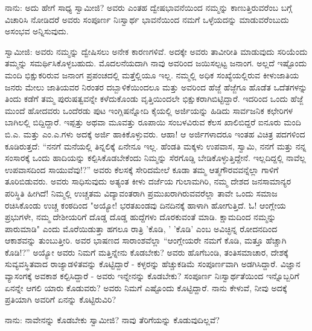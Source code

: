 ನಾನು: ಅದು ಹೇಗೆ ಸಾಧ್ಯ ಸ್ವಾಮೀಜಿ? ಅವರು ಎಂತಹ ದ್ವೇಷಭಾವನೆಯಿಂದ ನಮ್ಮನ್ನು ಕಾಣುತ್ತಿರುವರೆಂಬ ಬಗ್ಗೆ ವಿಚಾರಿಸಿ ನೋಡಿದರೆ ಅವರು ಸಂಪೂರ್ಣ ನಿಃಸ್ವಾರ್ಥ ಭಾವನೆಯಿಂದ ನಮಗೆ ಒಳ್ಳೆಯದನ್ನು ಮಾಡುವರೆಂಬುದು ಅಸಂಭವ ಅನ್ನಿಸುವುದು.

ಸ್ವಾಮೀಜಿ: ಅವರು ನಮ್ಮನ್ನು ದ್ವೇಷಿಸಲು ಅನೇಕ ಕಾರಣಗಳಿವೆ. ಅದಕ್ಕೇ ಅವರು ತಾವೀರೀತಿ ಮಾಡುವುದು ಸರಿಯೆಂದು ತಮ್ಮನ್ನು ಸಮರ್ಥಿಸಿಕೊಳ್ಳಬಹುದು. ಮೊದಲನೆಯದಾಗಿ ನಾವು ಅವರಿಂದ ಜಯಿಸಲ್ಪಟ್ಟ ಜನಾಂಗ. ಅಲ್ಲದೆ ಇಷ್ಟೊಂದು ಮಂದಿ ಭಿಕ್ಷುಕರಿರುವ ಜನಾಂಗ ಪ್ರಪಂಚದಲ್ಲಿ ಮತ್ತೆಲ್ಲಿಯೂ ಇಲ್ಲ. ನಮ್ಮಲ್ಲಿ ಅಧಿಕ ಸಂಖ್ಯೆಯಲ್ಲಿರುವ ಕೀಳುಜಾತಿಯ ಜನರು ಮೇಲು ಜಾತಿಯವರ ನಿರಂತರ ದಬ್ಬಾಳಿಕೆಯಿಂದಲೂ ಮತ್ತು ಅವರಿಂದ ಹೆಜ್ಜೆ ಹೆಜ್ಜೆಗೂ ಹೊಡೆತ ಒದೆತಗಳನ್ನು ತಿಂದು ಕಡೆಗೆ ತಮ್ಮ ಪುರುಷತ್ವವನ್ನೇ ಕಳೆದುಕೊಂಡು ವೃತ್ತಿಯಿಂದಲೇ ಭಿಕ್ಷುಕರಾಗಿಬಿಟ್ಟಿದ್ದಾರೆ. ಇದರಿಂದ ಒಂದು ಹೆಜ್ಜೆ ಮುಂದೆ ಹೋದವರು ಒಂದೆರಡು ಪುಟ ಇಂಗ್ಲಿಷನ್ನೋದಿ ಕೈಯಲ್ಲಿ ಅರ್ಜಿಯನ್ನು ಹಿಡಿದು ಸಾರ್ವಜನಿಕ ಕಛೇರಿಗಳ ಬಾಗಿಲಲ್ಲಿ ಬಿದ್ದಿದ್ದಾರೆ. ಇಪ್ಪತ್ತು ಅಥವಾ ಮೂವತ್ತು ರೂಪಾಯಿ ಸಂಬಳವಿರುವ ಕೆಲಸ ಖಾಲಿಬಿದ್ದರೆ ಐನೂರು ಮಂದಿ ಬಿ.ಎ. ಮತ್ತು ಎಂ.ಎ.ಗಳು ಅದಕ್ಕೆ ಅರ್ಜಿ ಹಾಕಿಕೊಳ್ಳುವರು. ಆಹಾ! ಆ ಅರ್ಜಿಗಳಾದರೂ ಇಂತಹ ವಿಚಿತ್ರ ಪದಗಳಿಂದ ಕೂಡಿರುತ್ತದೆ: “ನನಗೆ ಮನೆಯಲ್ಲಿ ತಿನ್ನಲಿಕ್ಕೆ ಏನೇನೂ ಇಲ್ಲ. ಹೆಂಡತಿ ಮಕ್ಕಳು ಉಪವಾಸ, ಸ್ವಾಮಿ, ನನಗೆ ಮತ್ತು ನನ್ನ ಸಂಸಾರಕ್ಕೆ ಒಂದು ಹಾದಿಯನ್ನು ಕಲ್ಪಿಸಿಕೊಡಬೇಕೆಂದು ನಿಮ್ಮನ್ನು ಸೆರಗೊಡ್ಡಿ ಬೇಡಿಕೊಳ್ಳುತ್ತಿದ್ದೇನೆ. ಇಲ್ಲದಿದ್ದಲ್ಲಿ ನಾವೆಲ್ಲ ಉಪವಾಸದಿಂದ ಸಾಯುವೆವು!?” ಅವರು ಕೆಲಸಕ್ಕೆ ಸೇರಿದಮೇಲೆ ಕೂಡಾ ತಮ್ಮ ಆತ್ಮಗೌರವವನ್ನೆಲ್ಲಾ ಗಾಳಿಗೆ ತೂರಿಬಿಡುವರು. ಅವರು ಸಾಧಿಸುವುದು ಅತ್ಯಂತ ಕೀಳು ದರ್ಜೆಯ ಗುಲಾಮಗಿರಿ, ನಮ್ಮ ದೇಶದ ಜನಸಾಮಾನ್ಯರ ಪರಿಸ್ಥಿತಿ ಹೀಗಿದೆ! ನಿಮ್ಮಲ್ಲಿ ಉಚ್ಚತಮ ವಿದ್ಯಾವಂತರಾಗಿ ಪ್ರಮುಖರಾಗಿರುವವರೆಲ್ಲಾ ತಾವೇ ಒಂದು ಸಮಾಜ ರಚಿಸಿಕೊಂಡು ಉಚ್ಚ ಕಂಠದಿಂದ "ಅಯ್ಯೋ! ಭರತಖಂಡವು ದಿನದಿನಕ್ಕೆ ಹಾಳಾಗಿ ಹೋಗುತ್ತಿದೆ. ಓ! ಆಂಗ್ಲೇಯ ಪ್ರಭುಗಳೇ, ನಮ್ಮ ದೇಶೀಯರಿಗೆ ದೊಡ್ಡ ದೊಡ್ಡ ಹುದ್ದೆಗಳು ದೊರಕುವಂತೆ ಮಾಡಿ. ಕ್ಷಾಮದಿಂದ ನಮ್ಮನ್ನು ಪಾರುಮಾಡಿ" ಎಂದು ಮೊರೆಯಿಡುತ್ತಾ ಹಗಲೂ ರಾತ್ರಿ 'ಕೊಡಿ, ' 'ಕೊಡಿ' ಎಂಬ ಅವಿಚ್ಛಿನ್ನ ರೋದನದಿಂದ ಆಕಾಶವನ್ನು ತುಂಬುತ್ತೀರಿ. ಅವರ ಭಾಷಣದ ಸಾರಾಂಶವೆಲ್ಲಾ “ಆಂಗ್ಲೇಯರೇ ನಮಗೆ ಕೊಡಿ, ಮತ್ತೂ ಹೆಚ್ಚಾಗಿ ಕೊಡಿ!?” ಅಯ್ಯೋ ಅವರು ನಿಮಗೆ ಮತ್ತಿನ್ನೇನು ಕೊಡಬೇಕು? ಅವರು ಹೊಗೆಬಂಡಿ, ತಂತಿಸಮಾಚಾರ, ದೇಶಕ್ಕೆ ಸುವ್ಯವಸ್ಥಿತವಾದ ರಾಜ್ಯಾಡಳಿತವನ್ನು ಕೊಟ್ಟಿದ್ದಾರೆ - ಕಳ್ಳರನ್ನು ಹೆಚ್ಚುಕಡಿಮೆ ಸಂಪೂರ್ಣವಾಗಿ ಅಡಗಿಸಿದ್ದಾರೆ. ವಿಜ್ಞಾನ ವ್ಯಾಸಂಗಕ್ಕೆ ಅವಕಾಶ ಕಲ್ಪಿಸಿದ್ದಾರೆ - ಅವರು ಇನ್ನೇನನ್ನು ಕೊಡಬೇಕು? ಸಂಪೂರ್ಣ ನಿಃಸ್ವಾರ್ಥತೆಯಿಂದ ಇನ್ನೊಬ್ಬರಿಗೆ ಏನನ್ನೇ ಆಗಲಿ ಯಾರು ಕೊಡುವರು? ಅವರು ನಿಮಗೆ ಎಷ್ಟೊಂದು ಕೊಟ್ಟಿದ್ದಾರೆ. ನಾನು ಕೇಳುವೆ, ನೀವು ಅದಕ್ಕೆ ಪ್ರತಿಯಾಗಿ ಅವರಿಗೆ ಏನನ್ನು ಕೊಟ್ಟಿರುವಿರಿ?

ನಾನು: ನಾವೇನನ್ನು ಕೊಡಬೇಕು ಸ್ವಾಮೀಜಿ? ನಾವು ತೆರಿಗೆಯನ್ನು ಕೊಡುವುದಿಲ್ಲವೆ?

